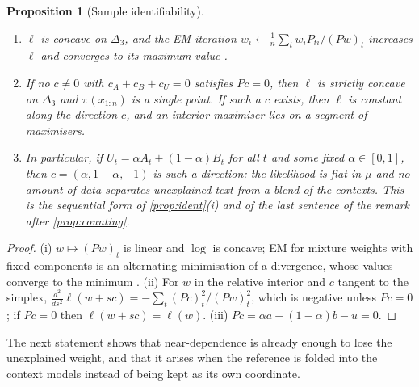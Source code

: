 \documentclass[11pt]{article}
\newtheorem{proposition}[theorem]{Proposition}
\theoremstyle{definition}
\theoremstyle{remark}
\begin{document}
\begin{proposition}[Sample identifiability]\label{prop:sample-ident}
\leavevmode
\begin{enumerate}[label=(\roman*)]
\item $\ell$ is concave on $\Delta_3$, and the EM iteration
  $w_i\leftarrow\frac1n\sum_tw_iP_{ti}/(Pw)_t$ increases $\ell$ and converges to its maximum value
  \cite{DempsterLairdRubin1977,CsiszarTusnady1984}.
\item If no $c\ne0$ with $c_A+c_B+c_U=0$ satisfies $Pc=0$, then $\ell$ is strictly concave on
  $\Delta_3$ and $\pi(x_{1:n})$ is a single point. If such a $c$ exists, then $\ell$ is constant along
  the direction $c$, and an interior maximiser lies on a segment of maximisers.
\item In particular, if $U_t=\alpha A_t+(1-\alpha)B_t$ for all $t$ and some fixed $\alpha\in[0,1]$, then
  $c=(\alpha,1-\alpha,-1)$ is such a direction: the likelihood is flat in $\mu$ and no amount of data
  separates unexplained text from a blend of the contexts. This is the sequential form of
  \cref{prop:ident}(i) and of the last sentence of the remark after \cref{prop:counting}.
\end{enumerate}
\end{proposition}
\begin{proof}
(i) $w\mapsto(Pw)_t$ is linear and $\log$ is concave; EM for mixture weights with fixed components
is an alternating minimisation of a divergence, whose values converge to the minimum
\cite{CsiszarTusnady1984}. (ii) For $w$ in the relative interior and $c$ tangent to the simplex,
$\frac{d^2}{ds^2}\ell(w+sc)=-\sum_t(Pc)_t^2/(Pw)_t^2$, which is negative unless $Pc=0$; if $Pc=0$
then $\ell(w+sc)=\ell(w)$. (iii) $Pc=\alpha a+(1-\alpha)b-u=0$.
\end{proof}

The next statement shows that near-dependence is already enough to lose the unexplained weight,
and that it arises when the reference is folded into the context models instead of being kept as
its own coordinate.
\end{document}
